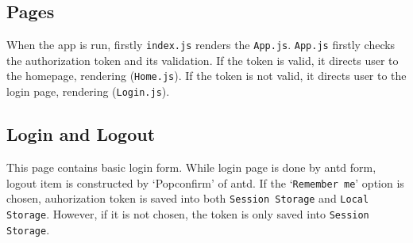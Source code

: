 \subsection{Pages}

When the app is run, firstly \texttt{index.js} renders the \texttt{App.js}. \texttt{App.js} firstly checks the authorization token and its validation. If the token is valid, it directs user to the homepage, rendering (\texttt{Home.js}). If the token is not valid, it directs user to the login page, rendering (\texttt{Login.js}).

\subsection{Login and Logout}

This page contains basic login form. While login page is done by antd form, logout item is constructed by `Popconfirm' of antd. If the `\texttt{Remember me}' option is chosen, auhorization token is saved into both \texttt{Session Storage} and \texttt{Local Storage}. However, if it is not chosen, the token is only saved into \texttt{Session Storage}.


